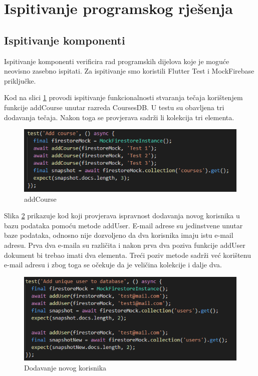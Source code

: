 			
			
			\eject 
		
	
		\section{Ispitivanje programskog rješenja}
			
			\subsection{Ispitivanje komponenti}
			
			Ispitivanje komponenti verificira rad programskih dijelova koje je moguće neovisno zasebno ispitati. Za ispitivanje smo koristili Flutter Test i MockFirebase priključke.
			
			Kod na slici \ref{fig:addCourse} provodi ispitivanje funkcionalnosti stvaranja tečaja korištenjem funkcije addCourse unutar razreda CoursesDB. U testu su obavljena tri dodavanja tečaja. Nakon toga se provjerava sadrži li kolekcija tri elementa.
			
			\begin{figure}[h]
				\includegraphics[scale=0.75]{slike/addCourse.PNG}
				\centering
				\caption{addCourse}
				\label{fig:addCourse}
			\end{figure}
			
			Slika \ref{fig:addUniqueUser} prikazuje kod koji provjerava ispravnost dodavanja novog korisnika u bazu podataka pomoću metode addUser. E-mail adrese su jedinstvene unutar baze podataka, odnosno nije dozvoljeno da dva korisnika imaju istu e-mail adresu. Prva dva e-maila su različita i nakon prva dva poziva funkcije addUser dokument bi trebao imati dva elementa. Treći poziv metode sadrži već korištenu e-mail adresu i zbog toga se očekuje da je veličina kolekcije i dalje dva.
			
			\begin{figure}[h]
				\includegraphics[scale=0.75]{slike/addUniqueUser.PNG}
				\centering
				\caption{Dodavanje novog korisnika}
				\label{fig:addUniqueUser}
			\end{figure}
			
